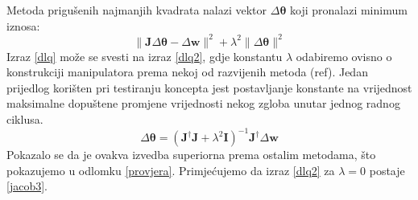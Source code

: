 \documentclass[times, utf8, diplomski, numeric]{fer}
\begin{document}
Metoda prigušenih najmanjih kvadrata nalazi vektor $\Delta \bm{\theta}$ koji pronalazi minimum iznosa:
\begin{equation}
\|\mathbf{J}\Delta \bm{\theta} - \Delta \textbf{w}\|^2 + \lambda^2\|\Delta \bm{\theta}\|^2 \label{dlq}
\end{equation}
Izraz \ref{dlq} može se svesti na izraz \ref{dlq2}, gdje konstantu $\lambda$ odabiremo ovisno o konstrukciji manipulatora prema nekoj od razvijenih metoda (ref).
Jedan prijedlog korišten pri testiranju koncepta jest postavljanje konstante na vrijednost maksimalne dopuštene promjene vrijednosti nekog zgloba unutar jednog radnog ciklusa.
\begin{equation}
\Delta \bm{\theta} = \left(\mathbf{J}^{\dagger} \mathbf{J} + \lambda^2\mathbf{I}\right)^{-1}\mathbf{J}^{\dagger} \Delta \mathbf{w} \label{dlq2}
\end{equation}
Pokazalo se da je ovakva izvedba superiorna prema ostalim metodama, što pokazujemo u odlomku \ref{provjera}. Primjećujemo da izraz \ref{dlq2} za $\lambda = 0$ postaje \ref{jacob3}.
\end{document}
